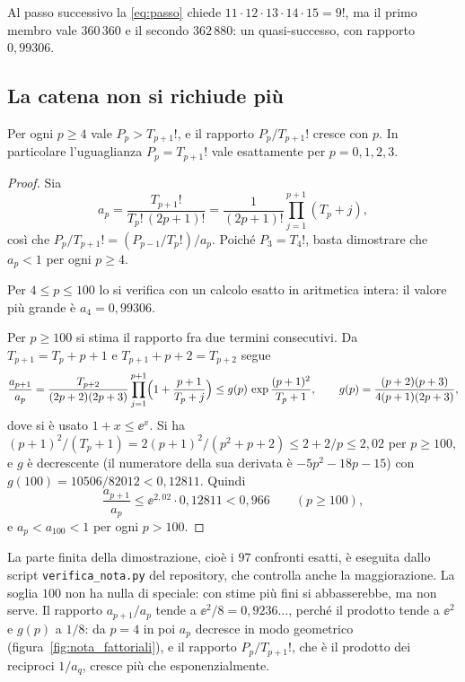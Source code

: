 Al passo successivo la \eqref{eq:passo} chiede
$11\cdot12\cdot13\cdot14\cdot15=9!$, ma il primo membro vale $360\,360$ e il
secondo $362\,880$: un quasi-successo, con rapporto $0{,}99306$.

\subsection{La catena non si richiude pi\`u}

\begin{prop}\label{prop:fattoriali}
Per ogni $p\ge4$ vale $P_p>T_{p+1}!$, e il rapporto $P_p/T_{p+1}!$ cresce
con $p$. In particolare l'uguaglianza $P_p=T_{p+1}!$ vale esattamente per
$p=0,1,2,3$.
\end{prop}

\begin{proof}
Sia
\[
  a_p=\frac{T_{p+1}!}{T_p!\,(2p+1)!}=\frac{1}{(2p+1)!}\prod_{j=1}^{p+1}(T_p+j),
\]
cos\`i che $P_p/T_{p+1}!=(P_{p-1}/T_p!)/a_p$. Poich\'e $P_3=T_4!$, basta
dimostrare che $a_p<1$ per ogni $p\ge4$.

Per $4\le p\le100$ lo si verifica con un calcolo esatto in aritmetica
intera: il valore pi\`u grande \`e $a_4=0{,}99306$.

Per $p\ge100$ si stima il rapporto fra due termini consecutivi. Da
$T_{p+1}=T_p+p+1$ e $T_{p+1}+p+2=T_{p+2}$ segue
\[
  \frac{a_{p+1}}{a_p}
  =\frac{T_{p+2}}{(2p+2)(2p+3)}\prod_{j=1}^{p+1}\Bigl(1+\frac{p+1}{T_p+j}\Bigr)
  \le g(p)\,\exp\frac{(p+1)^2}{T_p+1},
  \qquad
  g(p)=\frac{(p+2)(p+3)}{4(p+1)(2p+3)},
\]
dove si \`e usato $1+x\le\ee^{x}$. Si ha
$(p+1)^2/(T_p+1)=2(p+1)^2/(p^2+p+2)\le2+2/p\le2{,}02$ per $p\ge100$, e $g$
\`e decrescente (il numeratore della sua derivata \`e $-5p^2-18p-15$) con
$g(100)=10506/82012<0{,}12811$. Quindi
\[
  \frac{a_{p+1}}{a_p}\le \ee^{2{,}02}\cdot0{,}12811<0{,}966
  \qquad (p\ge100),
\]
e $a_p<a_{100}<1$ per ogni $p>100$.
\end{proof}

La parte finita della dimostrazione, cio\`e i $97$ confronti esatti, \`e
eseguita dallo script \texttt{verifica\_nota.py} del repository, che
controlla anche la maggiorazione. La soglia $100$ non ha nulla di speciale: con stime pi\`u
fini si abbasserebbe, ma non serve. Il rapporto $a_{p+1}/a_p$ tende a
$\ee^2/8=0{,}9236\dots$, perch\'e il prodotto tende a $\ee^2$ e $g(p)$ a
$1/8$: da $p=4$ in poi $a_p$ decresce in modo geometrico
(figura~\ref{fig:nota_fattoriali}), e il rapporto $P_p/T_{p+1}!$, che \`e il
prodotto dei reciproci $1/a_q$, cresce pi\`u che esponenzialmente.

